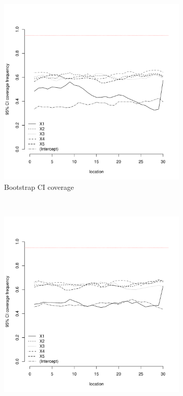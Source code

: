 \documentclass[authoryear, review, 11pt]{elsarticle}
\begin{document}
\begin{figure}
	\vspace{-30mm}
	\centering
	\begin{subfigure}[b]{0.45\textwidth}
	\centering
		\includegraphics[width=\textwidth]{../../figures/simulation/15.24.profile_bootstrap_coverage.pdf}
		\caption{Bootstrap CI coverage}
	\end{subfigure}%
	~ %
	\begin{subfigure}[b]{0.45\textwidth}
	\centering
		\includegraphics[width=\textwidth]{../../figures/simulation/15.24.profile_se_coverage.pdf}

\end{subfigure}
\end{figure}
\end{document}
